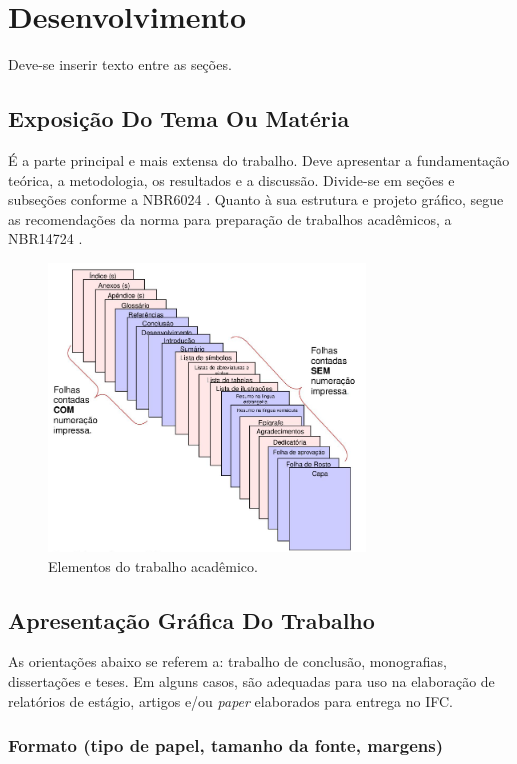 \chapter{Desenvolvimento}

Deve-se inserir texto entre as seções.

\section{Exposição Do Tema Ou Matéria}

É a parte principal e mais extensa do trabalho. Deve apresentar a fundamentação teórica, a metodologia, os resultados e a discussão. Divide-se em seções e subseções conforme a NBR6024 \cite{abnt6024}. 
Quanto à sua estrutura e projeto gráfico, segue as recomendações da norma para preparação de trabalhos acadêmicos, a NBR14724 \cite{abnt14724}.

\begin{figure}[!ht]
    \centering
    \caption{Elementos do trabalho acadêmico.}   \label{fig:fig1}
    \includegraphics[width = 0.75\textwidth]{images/___fig1.png}
\end{figure}

\section{Apresentação Gráfica Do Trabalho}
As orientações abaixo se referem a: trabalho de conclusão, monografias, dissertações e teses. Em alguns casos, são adequadas para uso na elaboração de relatórios de estágio, artigos e/ou \textit{paper} elaborados para entrega no IFC.


\subsection{\textbf{Formato (tipo de papel, tamanho da fonte, margens)}}


